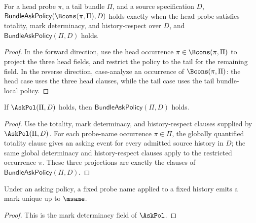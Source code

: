 \begin{theorem}
\label{thm:bundle-local-asking-policy-cons-decomposition}
For a head probe $\pi$, a tail bundle $\Pi$, and a source specification $D$,
$\mathsf{BundleAskPolicy}(\Bcons(\pi,\Pi),D)$ holds exactly when the head probe
satisfies totality, mark determinacy, and history-respect over $D$, and
$\mathsf{BundleAskPolicy}(\Pi,D)$ holds.
\end{theorem}
\begin{proof}
In the forward direction, use the head occurrence
$\pi\in\Bcons(\pi,\Pi)$ to project the three head fields, and restrict the
policy to the tail for the remaining field. In the reverse direction,
case-analyze an occurrence of $\Bcons(\pi,\Pi)$: the head case uses the three
head clauses, while the tail case uses the tail bundle-local policy.
\end{proof}

\begin{theorem}
\label{thm:global-asking-policy-restricts-to-bundle-local}
If $\AskPol(\Pi,D)$ holds, then $\mathsf{BundleAskPolicy}(\Pi,D)$ holds.
\end{theorem}
\begin{proof}
Use the totality, mark determinacy, and history-respect clauses supplied by $\AskPol(\Pi,D)$. For each probe-name occurrence $\pi\in\Pi$, the globally quantified totality clause gives an asking event for every admitted source history in $D$; the same global determinacy and history-respect clauses apply to the restricted occurrence $\pi$. These three projections are exactly the clauses of $\mathsf{BundleAskPolicy}(\Pi,D)$.
\end{proof}

\begin{lemma}
\label{thm:asking-determinacy}
\label{lem:asking-determinacy}
Under an asking policy, a fixed probe name applied to a fixed history emits a mark unique up to \(\msame\).
\end{lemma}
\begin{proof}
This is the mark determinacy field of \(\AskPol\).
\end{proof}
